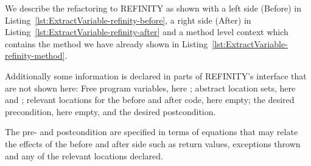 We describe the refactoring to REFINITY as shown with a left side (Before) in Listing~\ref{lst:ExtractVariable-refinity-before},
a right side (After) in Listing~\ref{lst:ExtractVariable-refinity-after} and a method level context which contains the method we have already shown in Listing~\ref{lst:ExtractVariable-refinity-method}.

Additionally some information is declared in parts of REFINITY's interface that are not shown here:
Free program variables, here ; abstract location sets, here  and ; relevant locations for the before and after code, here empty;
the desired precondition, here empty, and the desired postcondition.

The pre- and postcondition are specified in terms of equations that may relate the effects of the before and after side such as return values, exceptions thrown and any of the relevant locations declared.


